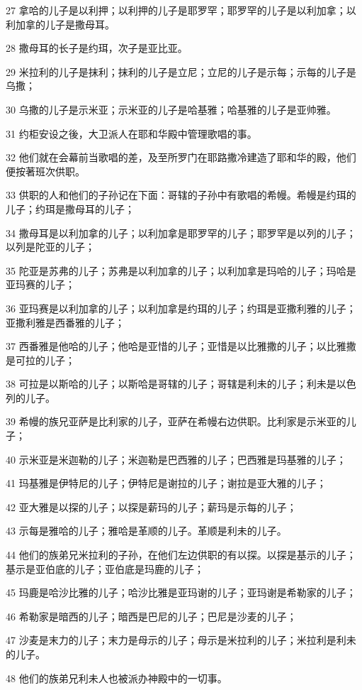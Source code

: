 \par 27 拿哈的儿子是以利押；以利押的儿子是耶罗罕；耶罗罕的儿子是以利加拿；以利加拿的儿子是撒母耳。
\par 28 撒母耳的长子是约珥，次子是亚比亚。
\par 29 米拉利的儿子是抹利；抹利的儿子是立尼；立尼的儿子是示每；示每的儿子是乌撒；
\par 30 乌撒的儿子是示米亚；示米亚的儿子是哈基雅；哈基雅的儿子是亚帅雅。
\par 31 约柜安设之後，大卫派人在耶和华殿中管理歌唱的事。
\par 32 他们就在会幕前当歌唱的差，及至所罗门在耶路撒冷建造了耶和华的殿，他们便按著班次供职。
\par 33 供职的人和他们的子孙记在下面：哥辖的子孙中有歌唱的希幔。希幔是约珥的儿子；约珥是撒母耳的儿子；
\par 34 撒母耳是以利加拿的儿子；以利加拿是耶罗罕的儿子；耶罗罕是以列的儿子；以列是陀亚的儿子；
\par 35 陀亚是苏弗的儿子；苏弗是以利加拿的儿子；以利加拿是玛哈的儿子；玛哈是亚玛赛的儿子；
\par 36 亚玛赛是以利加拿的儿子；以利加拿是约珥的儿子；约珥是亚撒利雅的儿子；亚撒利雅是西番雅的儿子；
\par 37 西番雅是他哈的儿子；他哈是亚惜的儿子；亚惜是以比雅撒的儿子；以比雅撒是可拉的儿子；
\par 38 可拉是以斯哈的儿子；以斯哈是哥辖的儿子；哥辖是利未的儿子；利未是以色列的儿子。
\par 39 希幔的族兄亚萨是比利家的儿子，亚萨在希幔右边供职。比利家是示米亚的儿子；
\par 40 示米亚是米迦勒的儿子；米迦勒是巴西雅的儿子；巴西雅是玛基雅的儿子；
\par 41 玛基雅是伊特尼的儿子；伊特尼是谢拉的儿子；谢拉是亚大雅的儿子；
\par 42 亚大雅是以探的儿子；以探是薪玛的儿子；薪玛是示每的儿子；
\par 43 示每是雅哈的儿子；雅哈是革顺的儿子。革顺是利未的儿子。
\par 44 他们的族弟兄米拉利的子孙，在他们左边供职的有以探。以探是基示的儿子；基示是亚伯底的儿子；亚伯底是玛鹿的儿子；
\par 45 玛鹿是哈沙比雅的儿子；哈沙比雅是亚玛谢的儿子；亚玛谢是希勒家的儿子；
\par 46 希勒家是暗西的儿子；暗西是巴尼的儿子；巴尼是沙麦的儿子；
\par 47 沙麦是末力的儿子；末力是母示的儿子；母示是米拉利的儿子；米拉利是利未的儿子。
\par 48 他们的族弟兄利未人也被派办神殿中的一切事。
